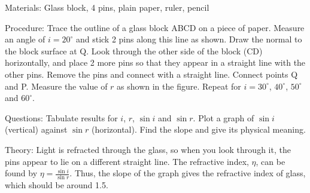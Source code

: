 \begin{multicols}{2}
\begin{description*}
\item[Materials:]{Glass block, 4 pins, plain paper, ruler, pencil}
\item[Procedure:]{Trace the outline of a glass block ABCD on a piece of paper. Measure an angle of $i=20^\circ$ and stick 2 pins along this line as shown. Draw the normal to the block surface at Q. Look through the other side of the block (CD) horizontally, and place 2 more pins so that they appear in a straight line with the other pins. Remove the pins and connect with a straight line. Connect points Q and P. Measure the value of $r$ as shown in the figure. Repeat for $i=30^\circ$, $40^\circ$, $50^\circ$ and $60^\circ$.}
\item[Questions:]{Tabulate results for $i$, $r$, $\sin{i}$ and $\sin{r}$. Plot a graph of $\sin{i}$ (vertical) against $\sin{r}$ (horizontal). Find the slope and give its physical meaning.}
\item[Theory:]{Light is refracted through the glass, so when you look through it, the pins appear to lie on a different straight line. The refractive index, $\eta$, can be found by $\eta = \frac{\sin{i}}{\sin{r}}$. Thus, the slope of the graph gives the refractive index of glass, which should be around 1.5.}
\end{description*}

\columnbreak

%
%


\end{multicols}
